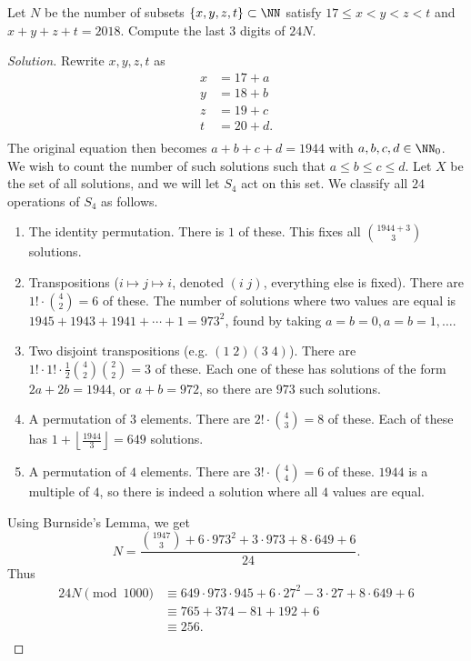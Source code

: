 \begin{prb}
Let $N$ be the number of subsets $\lbrace x, y, z, t \rbrace \subset \NN$
satisfy $17 \leq x < y < z < t$ and $x + y + z + t = 2018$. Compute the last $3$
digits of $24N$.
\end{prb}

\ifsolutions
\begin{proof}[Solution]
Rewrite $x, y, z, t$ as
\[ \begin{aligned}
x &= 17 + a \\
y &= 18 + b \\
z &= 19 + c \\
t &= 20 + d. \\
\end{aligned} \]
The original equation then becomes $a + b + c + d = 1944$ with $a, b, c, d \in
\NN_0$. We wish to count the number of such solutions such that $a \leq b \leq c
\leq d$. Let $X$ be the set of all solutions, and we will let $S_4$ act on this
set. We classify all $24$ operations of $S_4$ as follows.

\begin{enumerate}
\item
The identity permutation. There is $1$ of these. This fixes all $\binom{1944 +
3}{3}$ solutions.
\item
Transpositions ($i \mapsto j \mapsto i$, denoted $(i \; j)$, everything else is
fixed). There are $1! \cdot \binom{4}{2} = 6$ of these. The number of solutions
where two values are equal is $1945 + 1943 + 1941 + \cdots + 1 = 973^2$, found
by taking $a = b = 0, a = b = 1, \dots$.
\item
Two disjoint transpositions (e.g. $(1 \; 2) (3 \; 4)$). There are $1! \cdot 1!
\cdot \frac{1}{2} \binom{4}{2} \binom{2}{2} = 3$ of these. Each one of these has
solutions of the form $2a + 2b = 1944$, or $a + b = 972$, so there are $973$
such solutions.
\item
A permutation of $3$ elements. There are $2! \cdot \binom{4}{3} = 8$ of these.
Each of these has $1 + \left\lfloor \frac{1944}{3} \right\rfloor = 649$
solutions.
\item
A permutation of $4$ elements. There are $3! \cdot \binom{4}{4} = 6$ of these.
$1944$ is a multiple of $4$, so there is indeed a solution where all $4$ values
are equal.
\end{enumerate}
Using Burnside's Lemma, we get
\[ N = \frac{\binom{1947}{3} + 6 \cdot 973^2 + 3 \cdot 973 + 8 \cdot 649 +
6}{24}. \]
Thus
\[ \begin{aligned}
24N \pmod{1000} &\equiv 649 \cdot 973 \cdot 945 + 6 \cdot 27^2 - 3 \cdot 27 + 8
\cdot 649 + 6 \\
&\equiv 765 + 374 - 81 + 192 + 6 \\
&\equiv \boxed{256}. \\
\end{aligned} \]
\end{proof}
\fi

